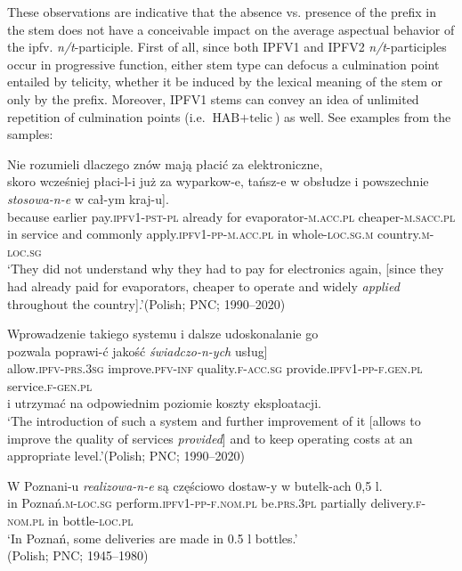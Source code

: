 \documentclass[output=paper]{langscibook}
\begin{document}
\noindent These observations are indicative that the absence vs. presence of the prefix in the stem does not have a conceivable impact on the average aspectual behavior of the ipfv. \textit{n/t}-participle. First of all, since both IPFV1 and IPFV2 \textit{n/t}-participles occur in progressive function, either stem type can defocus a culmination point entailed by telicity, whether it be induced by the lexical meaning of the stem or only by the prefix. Moreover, IPFV1 stems can convey an idea of unlimited repetition of culmination points (i.e. $\text{HAB}+\text{telic}$) as well. See examples from the samples:

\ea\label{wiem:ex:widely-applied}{{Nie rozumieli dlaczego znów mają płacić za elektroniczne,}\\
\gll \minsp{[} {skoro} {wcześniej} {płaci-l-i} {już} {za} {wyparkow-e,} {tańsz-e} {w} {obsłudze} {i} {powszechnie} {\textit{stosowa-n-e}} {w} {cał-ym} {kraj-u}].\\
{} because earlier pay.\textsc{ipfv1-pst-pl} already for evaporator-\textsc{m.acc.pl} cheaper-\textsc{m.sacc.pl} in service and commonly apply.\textsc{ipfv1-pp-m.acc.pl} in whole-\textsc{loc.sg.m} country.\textsc{m-loc.sg}\\
\glt ‘They did not understand why they had to pay for electronics again, [since they had already paid for evaporators, cheaper to operate and widely \textit{applied} throughout the country].’\hfill (Polish; PNC; 1990--2020)
}
\z

\pagebreak
\ea\label{wiem:ex:service-provided}
{{Wprowadzenie takiego systemu i dalsze udoskonalanie go }\\
\gll \minsp{[} {pozwala} {poprawi-ć} {jakość} {\textit{świadczo-n-ych}} {usług}]\\
{} allow.\textsc{ipfv-prs.3sg} improve.\textsc{pfv-inf} quality.\textsc{f-acc.sg} provide.\textsc{ipfv1-pp-f.gen.pl} service.\textsc{f-gen.pl} \\{i utrzymać na odpowiednim poziomie koszty eksploatacji.}\\
\glt ‘The introduction of such a system and further improvement of it [allows to improve the quality of services \textit{provided}] and to keep operating costs at an appropriate level.’\hfill (Polish; PNC; 1990--2020)
}
\z

\ea\label{wiem:ex:made}{\gll
{W} {Poznani-u} {\textit{realizowa-n-e}} {są} {częściowo} {dostaw-y} {w} {butelk-ach} 0,5 l.\\
in Poznań.\textsc{m-loc.sg} perform.\textsc{ipfv1-pp-f.nom.pl} be.\textsc{prs.3pl} partially delivery.\textsc{f-nom.pl} in bottle-\textsc{loc.pl}\\
\glt ‘In Poznań, some deliveries are made in 0.5 l bottles.’ \\
\hfill (Polish; PNC; 1945--1980)
}
\z
\end{document}
